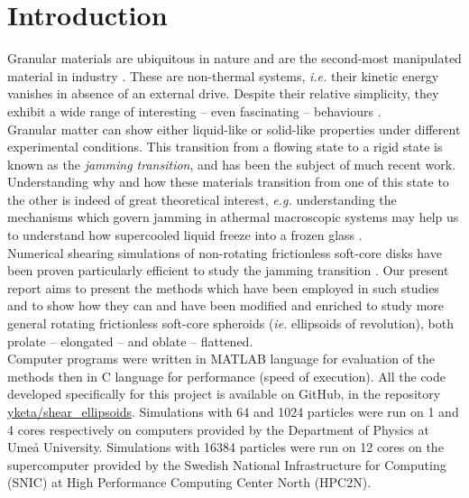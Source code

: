 \documentclass[class=report, float=false, crop=false]{standalone}
\begin{document}
\chapter*{Introduction}
\label{introduction}

Granular materials are ubiquitous in nature and are the second-most manipulated material in industry \cite{patrick2005slow}. These are non-thermal systems, \textit{i.e.} their kinetic energy vanishes in absence of an external drive. Despite their relative simplicity, they exhibit a wide range of interesting -- even fascinating -- behaviours \cite{youtube4}.\\

Granular matter can show either liquid-like or solid-like properties under different experimental conditions. This transition from a flowing state to a rigid state is known as the \textit{jamming transition}, and has been the subject of much recent work. Understanding why and how these materials transition from one of this state to the other is indeed of great theoretical interest, \textit{e.g.} understanding the mechanisms which govern jamming in athermal macroscopic systems may help us to understand how supercooled liquid freeze into a frozen glass \cite{liu1998nonlinear}.\\

Numerical shearing simulations of non-rotating frictionless soft-core disks have been proven particularly efficient to study the jamming transition \cite{PRL99.178001,PRE83.031307}. Our present report aims to present the methods which have been employed in such studies and to show how they can and have been modified and enriched to study more general rotating frictionless soft-core spheroids (\textit{ie.} ellipsoids of revolution), both prolate -- elongated -- and oblate -- flattened.\\

Computer programs were written in MATLAB language for evaluation of the methods then in C language for performance (speed of execution). All the code developed specifically for this project is available on GitHub, in the repository \href{https://github.com/yketa/shear_ellipsoids}{yketa/shear\_ellipsoids}. Simulations with 64 and 1024 particles were run on 1 and 4 cores respectively on computers provided by the Department of Physics at Umeå University. Simulations with 16384 particles were run on 12 cores on the supercomputer provided by the Swedish National Infrastructure for Computing (SNIC) at High Performance Computing Center North (HPC2N).\\
\end{document}

